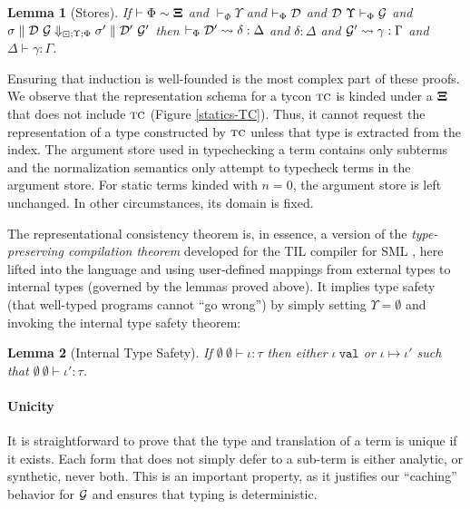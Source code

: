 \documentclass[9pt,preprint]{sigplanconf}
\newtheorem{lemma}{Lemma}
\begin{document}
\begin{lemma}[Stores] If $\vdash \Phi \sim \boldsymbol\Xi$ and $\vdash_\Phi \Upsilon$ and $\vdash_\Phi \mathcal{D}$ and $\mathcal{D}~\Upsilon \vdash_\Phi \mathcal{G}$ and $\sigma \parallel \mathcal{D}~\mathcal{G} \Downarrow_{\boxdot; \Upsilon; \Phi} \sigma' \parallel \mathcal{D}'~\mathcal{G}'$ then $\vdash_\Phi \mathcal{D}' \leadsto \delta : \Delta$ and $\delta : \Delta$ and $\mathcal{G}' \leadsto \gamma : \Gamma$ and $\Delta \vdash \gamma : \Gamma$.
\end{lemma}

Ensuring that induction is well-founded is the most complex part of these proofs. We observe that the representation schema for a tycon $\textsc{tc}$ is kinded under a $\boldsymbol\Xi$ that does not include $\textsc{tc}$ (Figure \ref{statics-TC}). Thus, it cannot request the representation of a type constructed by $\textsc{tc}$ unless that type is extracted from the index.
The argument store used in typechecking a term contains only subterms and the normalization semantics only attempt to typecheck terms in the argument store. For static terms kinded with $n=0$, the argument store is left unchanged. In other circumstances, its domain is fixed.

The representational consistency theorem is, in essence, a version of the \emph{type-preserving compilation theorem} developed for the TIL compiler for SML \cite{tarditi+:til-OLD}, here lifted into the language and using user-defined mappings from external types to internal types (governed by the lemmas proved above). It implies type safety (that well-typed programs cannot ``go wrong'') by simply setting $\Upsilon=\emptyset$ and invoking the internal type safety theorem: 

\begin{lemma}[Internal Type Safety]
If $\emptyset~\emptyset \vdash \iota : \tau$ then either $\iota~\mathtt{val}$ or $\iota \mapsto \iota'$ such that $\emptyset~\emptyset \vdash \iota' : \tau$.
\end{lemma}

\paragraph{Unicity} It is straightforward to prove that the type and translation of a term is unique if it exists. Each form that does not simply defer to a sub-term is either analytic, or synthetic, never both. This is an important property, as it justifies our ``caching'' behavior for $\mathcal{G}$ and ensures that typing is deterministic. 
\end{document}
